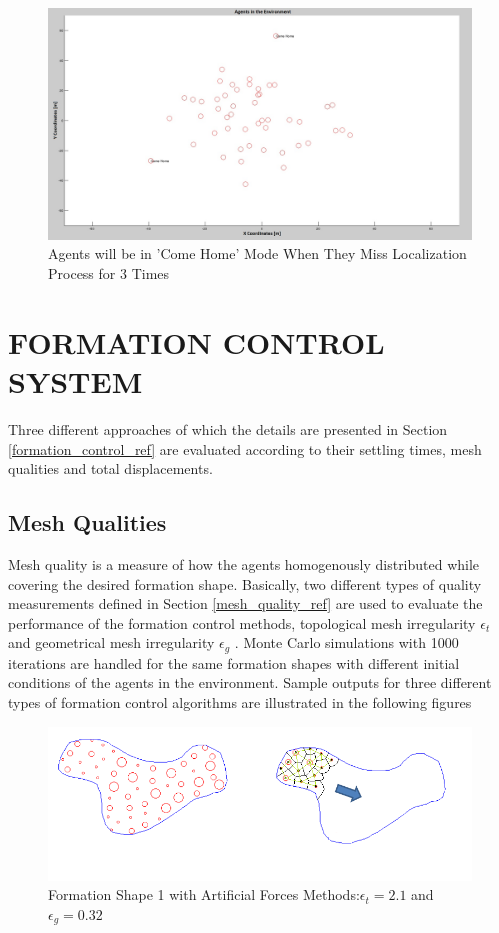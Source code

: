 \begin{figure}[H]
\captionsetup{format=hang,justification=centerfirst}
\caption{Agents will be in 'Come Home' Mode When They Miss Localization Process for 3 Times}
\centerline{\includegraphics[scale = 0.27]{Lost-2-3}}
\end{figure} 		
		
\section{FORMATION CONTROL SYSTEM}
Three different approaches of which the details are presented in Section \ref{formation_control_ref} are evaluated according to their settling times, mesh qualities and total displacements. 

\subsection{Mesh Qualities} 
Mesh quality is a measure of how the agents homogenously distributed while covering the desired formation shape. Basically, two different types of quality measurements defined in Section \ref{mesh_quality_ref} are used to evaluate the performance of the formation control methods, topological mesh irregularity $\epsilon_t$ and geometrical mesh irregularity $\epsilon_g$ . Monte Carlo simulations with 1000 iterations are handled for the same formation shapes with different initial conditions of the agents in the environment. Sample outputs for three different types of formation control algorithms are illustrated in the following figures
  
\begin{figure}[H]
\caption{Formation Shape 1 with Artificial Forces Methods:$\epsilon_t = 2.1$ and $\epsilon_g = 0.32$}
\centerline{\includegraphics[scale = 0.70]{Artificial_Forces_Mesh_1}}
\end{figure} 		
		

